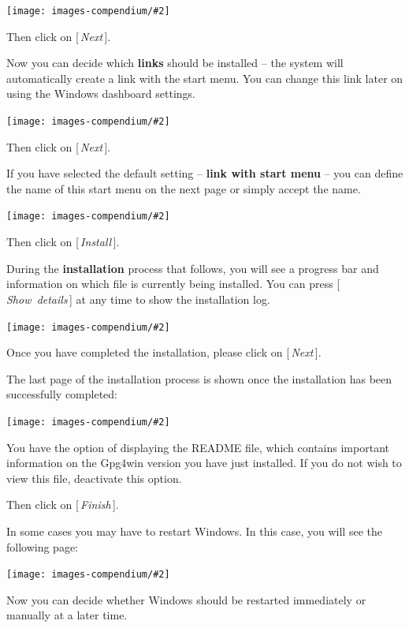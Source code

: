 \documentclass[a4paper,11pt,oneside,openright,titlepage]{scrbook}
\newcommand{\Button}[1]{[\,\textit{#1}\,]}
\newcommand{\IncludeImage}[2][]{
\begin{center}
  \texttt{[image: images-compendium/\#2]}%
\end{center}
}
\begin{document}
\IncludeImage[width=0.85\textwidth]{sc-inst-directory_en}

Then click on \Button{Next}.

\clearpage
Now you can decide which \textbf{links} should be installed -- the
system will automatically create a link with the start menu. You can
change this link later on using the Windows dashboard settings.

\IncludeImage[width=0.85\textwidth]{sc-inst-options_en}

Then click on \Button{Next}.

\clearpage
If you have selected the default setting -- \textbf{link with start
menu} -- you can define the name of this start menu on the next page
or simply accept the name.

\IncludeImage[width=0.85\textwidth]{sc-inst-startmenu_en}

Then click on \Button{Install}.

\clearpage
During the \textbf{installation} process that follows, you will see a progress bar and information on which file is currently being installed. You can press \Button{Show~details}
at any time to show the installation log.

\IncludeImage[width=0.85\textwidth]{sc-inst-progress_en}

Once you have completed the installation, please click on
\Button{Next}.

\clearpage
The last page of the installation process is shown once the
installation has been successfully completed:

\IncludeImage[width=0.85\textwidth]{sc-inst-finished_en}

You have the option of displaying the README file, which contains
important information on the Gpg4win version you have just installed.
If you do not wish to view this file, deactivate this option.

Then click on \Button{Finish}.

\clearpage
In some cases you may have to restart Windows. In this case, you will
see the following page:

\IncludeImage[width=0.85\textwidth]{sc-inst-finished2_en}

Now you can decide whether Windows should be restarted immediately or
manually at a later time.
\end{document}
